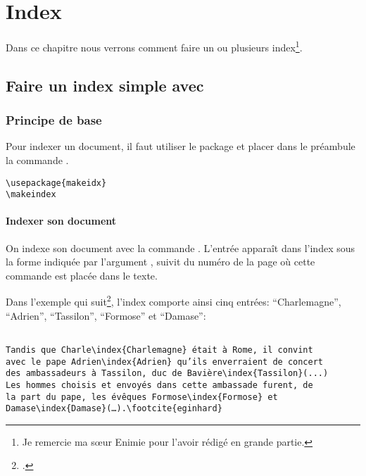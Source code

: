 \chapter{Index}

\begin{prealable}

Dans ce chapitre nous verrons comment faire un ou plusieurs index\footnote{Je remercie ma sœur Enimie pour l'avoir rédigé en grande partie.}.

\end{prealable}


\section{Faire un index simple avec }


\subsection{Principe de base}


Pour indexer un document, il faut utiliser le package  et placer  dans le préambule la commande .

\begin{verbatim}
\usepackage{makeidx}
\makeindex
\end{verbatim}

\subsubsection{Indexer son document}



On indexe son document avec  la commande \label{cmdindex}. L'entrée apparaît dans l'index sous la forme indiquée par l'argument , suivit du numéro de la page où cette commande est placée dans le texte. 

Dans l'exemple qui suit\footcite{eginhard}, l'index comporte ainsi cinq entrées: \enquote{Charlemagne}, \enquote{Adrien}, \enquote{Tassilon}, \enquote{Formose} et \enquote{Damase}:

\begin{verbatim}

Tandis que Charle\index{Charlemagne} était à Rome, il convint
avec le pape Adrien\index{Adrien} qu’ils enverraient de concert
des ambassadeurs à Tassilon, duc de Bavière\index{Tassilon}(...)
Les hommes choisis et envoyés dans cette ambassade furent, de 
la part du pape, les évêques Formose\index{Formose} et 
Damase\index{Damase}(…).\footcite{eginhard}

\end{verbatim}



